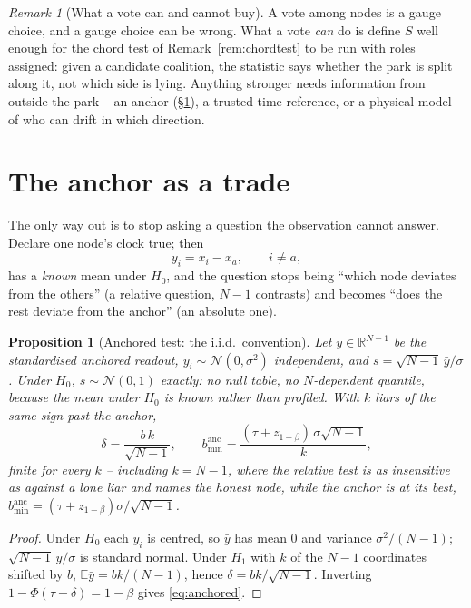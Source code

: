 \documentclass[10pt,twocolumn,a4paper]{article}
\newtheorem{proposition}[theorem]{Proposition}
\theoremstyle{definition}
\theoremstyle{remark}
\newtheorem{remark}[theorem]{Remark}
\newcommand{\R}{\mathbb{R}}
\newcommand{\bmin}{b_{\min}}
\newcommand{\taur}{\tau}
\begin{document}
\begin{remark}[What a vote can and cannot buy]
A vote among nodes is a gauge choice, and a gauge choice can be wrong. What a vote
\emph{can} do is define $S$ well enough for the chord test of
Remark~\ref{rem:chordtest} to be run with roles assigned: given a candidate
coalition, the statistic says whether the park is split along it, not which side
is lying. Anything stronger needs information from outside the park -- an anchor
(\S\ref{sec:anchor}), a trusted time reference, or a physical model of who can
drift in which direction.
\end{remark}

\section{The anchor as a trade}
\label{sec:anchor}

The only way out is to stop asking a question the observation cannot answer.
Declare one node's clock true; then
\begin{equation}
y_i=x_i-x_a,\qquad i\neq a,
\label{eq:anchor}
\end{equation}
has a \emph{known} mean under $H_0$, and the question stops being ``which node
deviates from the others'' (a relative question, $N-1$ contrasts) and becomes
``does the rest deviate from the anchor'' (an absolute one).

\begin{proposition}[Anchored test: the i.i.d.\ convention]
\label{prop:anchor}
Let $y\in\R^{N-1}$ be the standardised anchored readout, $y_i\sim\mathcal N(0,\sigma^2)$
independent, and $s=\sqrt{N-1}\,\bar y/\sigma$. Under $H_0$, $s\sim\mathcal N(0,1)$
exactly: no null table, no $N$-dependent quantile, because the mean under $H_0$ is
known rather than profiled. With $k$ liars of the same sign past the anchor,
\begin{equation}
\delta=\frac{b\,k}{\sqrt{N-1}},\qquad
\bmin^{\mathrm{anc}}=\frac{({\taur}+z_{1-\beta})\,\sigma\sqrt{N-1}}{k},
\label{eq:anchored}
\end{equation}
finite for every $k$ -- including $k=N-1$, where the relative test is as
insensitive as against a lone liar \emph{and} names the honest node, while the
anchor is at its best, $\bmin^{\mathrm{anc}}=({\taur}+z_{1-\beta})\sigma/\sqrt{N-1}$.
\end{proposition}

\begin{proof}
Under $H_0$ each $y_i$ is centred, so $\bar y$ has mean $0$ and variance
$\sigma^2/(N-1)$; $\sqrt{N-1}\,\bar y/\sigma$ is standard normal. Under $H_1$ with
$k$ of the $N-1$ coordinates shifted by $b$, $\mathbb E\bar y=bk/(N-1)$, hence
$\delta=bk/\sqrt{N-1}$. Inverting $1-\Phi(\taur-\delta)=1-\beta$ gives
\eqref{eq:anchored}.
\end{proof}
\end{document}
